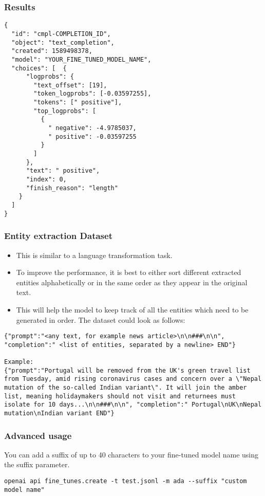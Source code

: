 \begin{frame}[fragile]\frametitle{Results}
\begin{lstlisting}
{
  "id": "cmpl-COMPLETION_ID",
  "object": "text_completion",
  "created": 1589498378,
  "model": "YOUR_FINE_TUNED_MODEL_NAME",
  "choices": [  {
      "logprobs": {
        "text_offset": [19],
        "token_logprobs": [-0.03597255],
        "tokens": [" positive"],
        "top_logprobs": [
          {
            " negative": -4.9785037,
            " positive": -0.03597255
          }
        ]
      },
      "text": " positive",
      "index": 0,
      "finish_reason": "length"
    }
  ]
}
\end{lstlisting}		

\end{frame}


\begin{frame}[fragile]\frametitle{Entity extraction Dataset}

\begin{itemize}
\item This is similar to a language transformation task. 
\item To improve the performance, it is best to either sort different extracted entities alphabetically or in the same order as they appear in the original text. 
\item This will help the model to keep track of all the entities which need to be generated in order. The dataset could look as follows:
\end{itemize}	 


\begin{lstlisting}
{"prompt":"<any text, for example news article>\n\n###\n\n", "completion":" <list of entities, separated by a newline> END"}

Example:
{"prompt":"Portugal will be removed from the UK's green travel list from Tuesday, amid rising coronavirus cases and concern over a \"Nepal mutation of the so-called Indian variant\". It will join the amber list, meaning holidaymakers should not visit and returnees must isolate for 10 days...\n\n###\n\n", "completion":" Portugal\nUK\nNepal mutation\nIndian variant END"}
\end{lstlisting}	
\end{frame}

\begin{frame}[fragile]\frametitle{Advanced usage}

You can add a suffix of up to 40 characters to your fine-tuned model name using the suffix parameter.



\begin{lstlisting}
openai api fine_tunes.create -t test.jsonl -m ada --suffix "custom model name"

\end{lstlisting}	
\end{frame}



